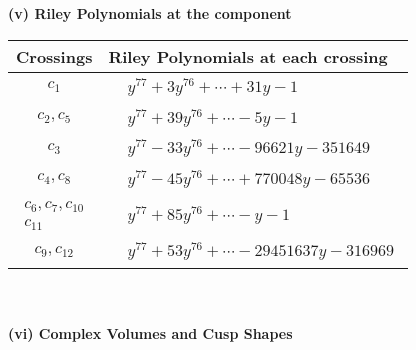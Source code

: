 \documentclass[1p]{elsarticle_modified}
\theoremstyle{definition}
\begin{document}
\newpage\renewcommand{\arraystretch}{1}
\flushleft \textbf{(v) Riley Polynomials at the component}\newline \\
\begin{tabular}{m{50pt}|m{274pt}}
Crossings & \hspace{64pt}Riley Polynomials at each crossing \\
\hline $$\begin{aligned}c_{1}\end{aligned}$$&$\begin{aligned}
&y^{77}+3 y^{76}+\cdots+31 y-1
\end{aligned}$\\
\hline $$\begin{aligned}c_{2},c_{5}\end{aligned}$$&$\begin{aligned}
&y^{77}+39 y^{76}+\cdots-5 y-1
\end{aligned}$\\
\hline $$\begin{aligned}c_{3}\end{aligned}$$&$\begin{aligned}
&y^{77}-33 y^{76}+\cdots-96621 y-351649
\end{aligned}$\\
\hline $$\begin{aligned}c_{4},c_{8}\end{aligned}$$&$\begin{aligned}
&y^{77}-45 y^{76}+\cdots+770048 y-65536
\end{aligned}$\\
\hline $$\begin{aligned}c_{6},c_{7},c_{10}\\c_{11}\end{aligned}$$&$\begin{aligned}
&y^{77}+85 y^{76}+\cdots- y-1
\end{aligned}$\\
\hline $$\begin{aligned}c_{9},c_{12}\end{aligned}$$&$\begin{aligned}
&y^{77}+53 y^{76}+\cdots-29451637 y-316969
\end{aligned}$\\
\hline
\end{tabular}\\~\\
\newpage\flushleft \textbf{(vi) Complex Volumes and Cusp Shapes}
\end{document}
